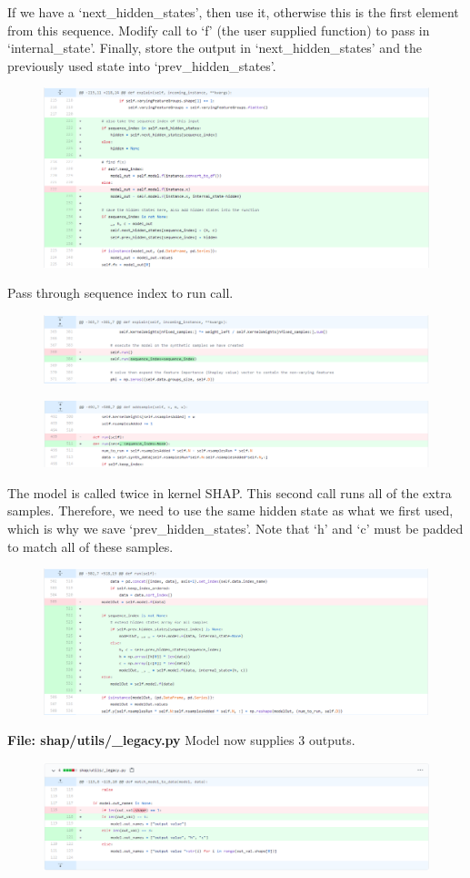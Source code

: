 \documentclass[12pt]{article}
\begin{document}
If we have a `next\_hidden\_states', then use it, otherwise this is the first element from this sequence. Modify call to `f' (the user supplied function) to pass in `internal\_state'. Finally, store the output in `next\_hidden\_states' and the previously used state into  `prev\_hidden\_states'.
\begin{figure}[H]
\includegraphics[scale=0.45]{diff/diff_6.png}
\end{figure}
Pass through sequence index to run call.
\begin{figure}[H]
\includegraphics[scale=0.45]{diff/diff_7.png}
\end{figure}
\begin{figure}[H]
\includegraphics[scale=0.45]{diff/diff_8.png}
\end{figure}
The model is called twice in kernel SHAP. This second call runs all of the extra samples. Therefore, we need to use the same hidden state as what we first used, which is why we save `prev\_hidden\_states'. Note that `h' and `c' must be padded to match all of these samples.
\begin{figure}[H]
\includegraphics[scale=0.45]{diff/diff_9.png}
\end{figure}
\textbf{File: shap/utils/\_legacy.py}
Model now supplies 3 outputs. 
\begin{figure}[H]
\includegraphics[scale=0.45]{diff/diff_10.png}
\end{figure}
\end{document}
